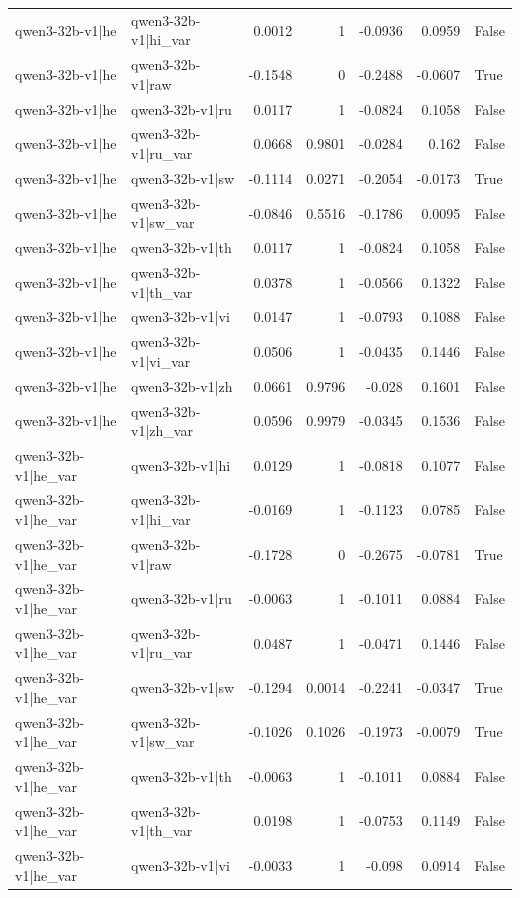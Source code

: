 \begin{table}
\begin{tabular}{l l r r r r l}
qwen3-32b-v1|he & qwen3-32b-v1|hi_var & 0.0012 & 1 & -0.0936 & 0.0959 & False \\
qwen3-32b-v1|he & qwen3-32b-v1|raw & -0.1548 & 0 & -0.2488 & -0.0607 & True \\
qwen3-32b-v1|he & qwen3-32b-v1|ru & 0.0117 & 1 & -0.0824 & 0.1058 & False \\
qwen3-32b-v1|he & qwen3-32b-v1|ru_var & 0.0668 & 0.9801 & -0.0284 & 0.162 & False \\
qwen3-32b-v1|he & qwen3-32b-v1|sw & -0.1114 & 0.0271 & -0.2054 & -0.0173 & True \\
qwen3-32b-v1|he & qwen3-32b-v1|sw_var & -0.0846 & 0.5516 & -0.1786 & 0.0095 & False \\
qwen3-32b-v1|he & qwen3-32b-v1|th & 0.0117 & 1 & -0.0824 & 0.1058 & False \\
qwen3-32b-v1|he & qwen3-32b-v1|th_var & 0.0378 & 1 & -0.0566 & 0.1322 & False \\
qwen3-32b-v1|he & qwen3-32b-v1|vi & 0.0147 & 1 & -0.0793 & 0.1088 & False \\
qwen3-32b-v1|he & qwen3-32b-v1|vi_var & 0.0506 & 1 & -0.0435 & 0.1446 & False \\
qwen3-32b-v1|he & qwen3-32b-v1|zh & 0.0661 & 0.9796 & -0.028 & 0.1601 & False \\
qwen3-32b-v1|he & qwen3-32b-v1|zh_var & 0.0596 & 0.9979 & -0.0345 & 0.1536 & False \\
qwen3-32b-v1|he_var & qwen3-32b-v1|hi & 0.0129 & 1 & -0.0818 & 0.1077 & False \\
qwen3-32b-v1|he_var & qwen3-32b-v1|hi_var & -0.0169 & 1 & -0.1123 & 0.0785 & False \\
qwen3-32b-v1|he_var & qwen3-32b-v1|raw & -0.1728 & 0 & -0.2675 & -0.0781 & True \\
qwen3-32b-v1|he_var & qwen3-32b-v1|ru & -0.0063 & 1 & -0.1011 & 0.0884 & False \\
qwen3-32b-v1|he_var & qwen3-32b-v1|ru_var & 0.0487 & 1 & -0.0471 & 0.1446 & False \\
qwen3-32b-v1|he_var & qwen3-32b-v1|sw & -0.1294 & 0.0014 & -0.2241 & -0.0347 & True \\
qwen3-32b-v1|he_var & qwen3-32b-v1|sw_var & -0.1026 & 0.1026 & -0.1973 & -0.0079 & True \\
qwen3-32b-v1|he_var & qwen3-32b-v1|th & -0.0063 & 1 & -0.1011 & 0.0884 & False \\
qwen3-32b-v1|he_var & qwen3-32b-v1|th_var & 0.0198 & 1 & -0.0753 & 0.1149 & False \\
qwen3-32b-v1|he_var & qwen3-32b-v1|vi & -0.0033 & 1 & -0.098 & 0.0914 & False \\

\end{tabular}
\end{table}
